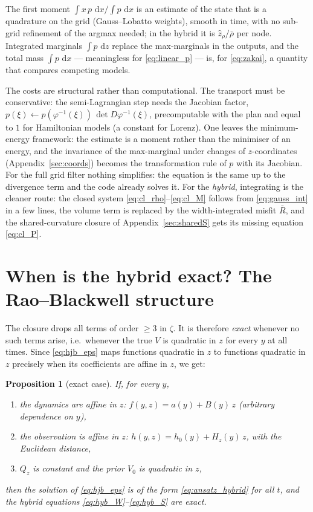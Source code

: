 \documentclass[11pt,a4paper]{article}
\newcommand{\dd}{\,\mathrm{d}}
\newcommand{\zr}{\hat{z}_{\rho}}   %
\theoremstyle{plain}
\newtheorem{proposition}{Proposition}
\theoremstyle{definition}
\theoremstyle{remark}
\begin{document}
The first moment $\int x\,p\,\dd x / \int p\,\dd x$ is an estimate of the state that is a quadrature on the grid (Gauss--Lobatto weights), smooth in time, with no sub-grid refinement of the argmax needed; in the hybrid it is $\zr/\bar\rho$ per node. Integrated marginals $\int p\,\dd z$ replace the max-marginals in the outputs, and the total mass $\int p\,\dd x$ --- meaningless for \eqref{eq:linear_p} --- is, for \eqref{eq:zakai}, a quantity that compares competing models.

The costs are structural rather than computational. The transport must be conservative: the semi-Lagrangian step needs the Jacobian factor, $p(\xi)\leftarrow p(\varphi^{-1}(\xi))\,\det D\varphi^{-1}(\xi)$, precomputable with the plan and equal to $1$ for Hamiltonian models (a constant for Lorenz). One leaves the minimum-energy framework: the estimate is a moment rather than the minimiser of an energy, and the invariance of the max-marginal under changes of $z$-coordinates (Appendix~\ref{sec:coords}) becomes the transformation rule of $p$ with its Jacobian. For the full grid filter nothing simplifies: the equation is the same up to the divergence term and the code already solves it. For the \emph{hybrid}, integrating is the cleaner route: the closed system \eqref{eq:cl_rho}--\eqref{eq:cl_M} follows from \eqref{eq:gauss_int} in a few lines, the volume term is replaced by the width-integrated misfit $\bar R$, and the shared-curvature closure of Appendix~\ref{sec:sharedS} gets its missing equation \eqref{eq:cl_P}.

\section{When is the hybrid exact? The Rao--Blackwell structure}
\label{sec:exact}

The closure drops all terms of order $\ge3$ in $\zeta$. It is therefore \emph{exact} whenever no such terms arise, i.e.\ whenever the true $V$ is quadratic in $z$ for every $y$ at all times. Since \eqref{eq:hjb_eps} maps functions quadratic in $z$ to functions quadratic in $z$ precisely when its coefficients are affine in $z$, we get:

\begin{proposition}[exact case]
If, for every $y$,
\begin{enumerate}[nosep,label=(\roman*)]
  \item the dynamics are affine in $z$: $f(y,z) = a(y) + B(y)\,z$ (arbitrary dependence on $y$),
  \item the observation is affine in $z$: $h(y,z) = h_0(y) + H_z(y)\,z$, with the Euclidean distance,
  \item $Q_z$ is constant and the prior $V_0$ is quadratic in $z$,
\end{enumerate}
then the solution of \eqref{eq:hjb_eps} is of the form \eqref{eq:ansatz_hybrid} for all $t$, and the hybrid equations \eqref{eq:hyb_W}--\eqref{eq:hyb_S} are exact.
\end{proposition}
\end{document}
